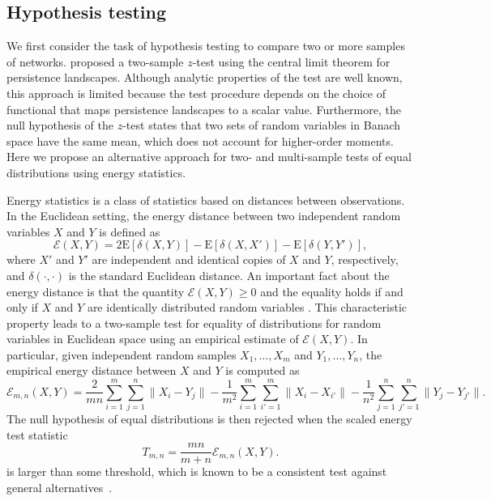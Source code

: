 \documentclass[12pt]{article}
\newcommand{\rmE}{\textrm{E}}
\begin{document}
\subsection{Hypothesis testing}


We first consider the task of hypothesis testing to compare two or more samples of networks.   \cite{bubenik_statistical_2015} proposed a two-sample $z$-test using the central limit theorem for persistence landscapes. Although analytic properties of the test are well known, this approach is limited because the test procedure depends on the choice of functional that maps persistence landscapes to a scalar value. Furthermore, the null hypothesis of the $z$-test states that two sets of random variables in Banach space have the same mean, which does not account for higher-order moments. Here we propose an alternative approach for two- and multi-sample tests of equal distributions using energy statistics. 


Energy statistics is a class of statistics based on distances between observations. In the Euclidean setting, the energy distance between two independent random variables $X$ and $Y$ is defined as
\begin{equation}\label{def:energy_distance}
\mathcal{E}(X,Y) = 2 \rmE [\delta(X,Y)]  - \rmE [\delta(X,X')] - \rmE[\delta(Y,Y')],
\end{equation}
where $X'$ and $Y'$ are independent and identical copies of $X$ and $Y$, respectively, and $\delta(\cdot,\cdot)$ is the standard Euclidean distance. An important fact about the energy distance is that the quantity $\mathcal{E}(X,Y) \geq 0$ and the equality holds if and only if $X$ and $Y$ are identically distributed random variables \citep{szekely_testing_2004}. This characteristic property leads to a two-sample test for equality of distributions for random variables in Euclidean space using an empirical estimate of $\mathcal{E}(X,Y)$. In particular, given independent random samples $X_1, \ldots, X_m$ and $Y_1,\ldots,Y_n$, the empirical energy distance between $X$ and $Y$ is computed as
\begin{equation}\label{def:energy_twosample_finite}
\mathcal{E}_{m,n}(X,Y) = \frac{2}{mn}\sum_{i=1}^m \sum_{j=1}^n \|X_i-Y_j\| - \frac{1}{m^2}\sum_{i=1}^m \sum_{i'=1}^m \|X_i - X_{i'}\| - \frac{1}{n^2} \sum_{j=1}^n \sum_{j'=1}^n \|Y_j - Y_{j'}\|.
\end{equation}
The null hypothesis of equal distributions is then rejected when the scaled energy test statistic 
\begin{equation*}
T_{m,n} = \frac{mn}{m+n} \mathcal{E}_{m,n}(X,Y).
\end{equation*}  
is larger than some threshold, which is known to be a consistent test against general alternatives~\citep{szekely_testing_2004}. 
\end{document}
